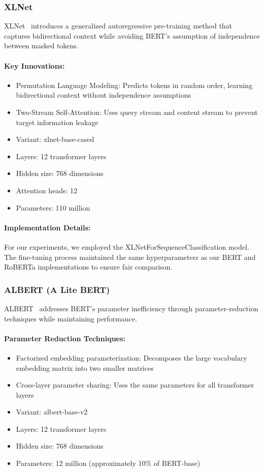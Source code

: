 \documentclass[12pt]{article}
\begin{document}
\subsubsection{XLNet}
XLNet~\cite{yang2019xlnet} introduces a generalized autoregressive pre-training method that captures bidirectional context while avoiding BERT's assumption of independence between masked tokens.

\paragraph{Key Innovations:}
\begin{itemize}
    \item Permutation Language Modeling: Predicts tokens in random order, learning bidirectional context without independence assumptions
    \item Two-Stream Self-Attention: Uses query stream and content stream to prevent target information leakage
    \item Variant: xlnet-base-cased
    \item Layers: 12 transformer layers
    \item Hidden size: 768 dimensions
    \item Attention heads: 12
    \item Parameters: 110 million
\end{itemize}

\paragraph{Implementation Details:}
For our experiments, we employed the XLNetForSequenceClassification model. The fine-tuning process maintained the same hyperparameters as our BERT and RoBERTa implementations to ensure fair comparison.

\subsubsection{ALBERT (A Lite BERT)}
ALBERT~\cite{lan2019albert} addresses BERT's parameter inefficiency through parameter-reduction techniques while maintaining performance.

\paragraph{Parameter Reduction Techniques:}
\begin{itemize}
    \item Factorized embedding parameterization: Decomposes the large vocabulary embedding matrix into two smaller matrices
    \item Cross-layer parameter sharing: Uses the same parameters for all transformer layers
    \item Variant: albert-base-v2
    \item Layers: 12 transformer layers
    \item Hidden size: 768 dimensions
    \item Parameters: 12 million (approximately 10\% of BERT-base)
\end{itemize}
\end{document}
